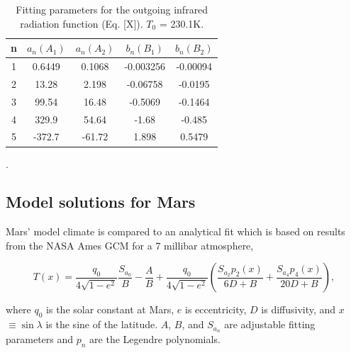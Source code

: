 \documentclass[12pt,onecolumn]{revtex4-2}    %
\begin{document}
\begin{table}
\begin{tabular}{ccccc} \toprule
    n & $a_{n} (A_{1})$ & $a_{n} (A_{2})$ & $b_{n} (B_{1})$ & $b_{n} (B_{2})$ \\ \midrule
    1  & 0.6449 & 0.1068 & -0.003256 & -0.00094 \\
    2  & 13.28 & 2.198 & -0.06758 & -0.0195 \\
    3  & 99.54  & 16.48 & -0.5069 & -0.1464 \\
    4 & 329.9 & 54.64 & -1.68 & -0.485      \\
    5 & -372.7 & -61.72 & 1.898 & 0.5479
\\

\bottomrule
\end{tabular}
\caption{Fitting parameters for the outgoing infrared radiation function (Eq. [X]). $T_{0}$ = 230.1K. }.
\end{table}

\subsection{Model solutions for Mars}
Mars' model climate is compared to an analytical fit \cite{KH18} which is based on results from the NASA Ames GCM for a 7 millibar atmosphere, 

\begin{equation}
T(x) = \frac{q_{0}}{4 \sqrt{1 - e^{2}}} \frac{S_{a_{0}}}{B} - \frac{A}{B} + \frac{q_{0}}{4 \sqrt{1 - e^{2}}} (\frac{S_{a_{2}}p_{2}(x)}{6D+B} + \frac{S_{a_{4}}p_{4}(x)}{20D+B}),
\end{equation}

where $q_{0}$ is the solar constant at Mars, $e$ is eccentricity, $D$ is diffusivity, and $x$ $\equiv \sin\lambda$ is the sine of the latitude. $A$, $B$, and $S_{a_{n}}$ are adjustable fitting parameters and $p_{n}$ are the Legendre polynomials.
\end{document}
